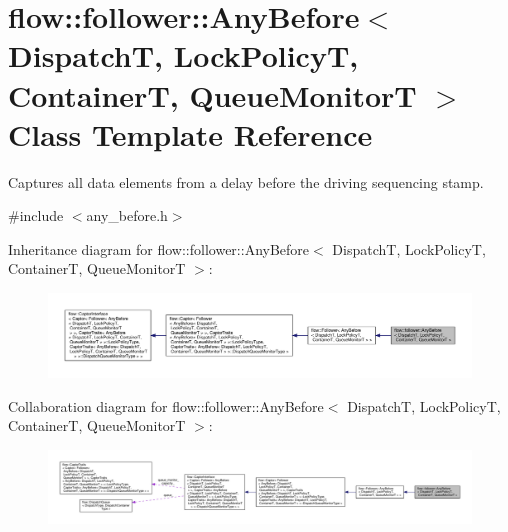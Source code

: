 \hypertarget{classflow_1_1follower_1_1_any_before}{}\section{flow\+:\+:follower\+:\+:Any\+Before$<$ DispatchT, Lock\+PolicyT, ContainerT, Queue\+MonitorT $>$ Class Template Reference}
\label{classflow_1_1follower_1_1_any_before}


Captures all data elements from a delay before the driving sequencing stamp.  




{\ttfamily \#include $<$any\+\_\+before.\+h$>$}



Inheritance diagram for flow\+:\+:follower\+:\+:Any\+Before$<$ DispatchT, Lock\+PolicyT, ContainerT, Queue\+MonitorT $>$\+:
\nopagebreak
\begin{figure}[H]
\begin{center}
\leavevmode
\includegraphics[width=350pt]{classflow_1_1follower_1_1_any_before__inherit__graph}
\end{center}
\end{figure}


Collaboration diagram for flow\+:\+:follower\+:\+:Any\+Before$<$ DispatchT, Lock\+PolicyT, ContainerT, Queue\+MonitorT $>$\+:
\nopagebreak
\begin{figure}[H]
\begin{center}
\leavevmode
\includegraphics[width=350pt]{classflow_1_1follower_1_1_any_before__coll__graph}
\end{center}
\end{figure}
